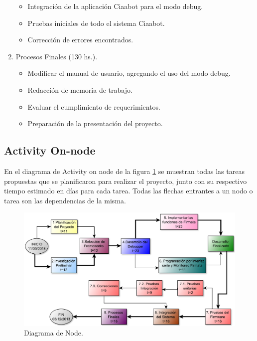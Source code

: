 \begin{enumerate}
	\begin{itemize}
		\item Integración de la aplicación Ciaabot para el modo debug.
		\item Pruebas iniciales de todo el sistema Ciaabot.
		\item Corrección de errores encontrados.
	\end{itemize}

	\item Procesos Finales (130 hs.).
	
	\begin{itemize}
		\item Modificar el manual de usuario, agregando el uso del modo debug.
		\item Redacción de memoria de trabajo.
		\item Evaluar el cumplimiento de requerimientos.
		\item Preparación de la presentación del proyecto.
	\end{itemize}

\end{enumerate}

\subsection{Activity On-node} 

En el diagrama de Activity on node de la figura  \ref{fig:diagramaNode} se muestran todas las tareas propuestas que se planificaron para realizar el proyecto, junto con su respectivo tiempo estimado en días para cada tarea.
Todas las flechas entrantes a un nodo o tarea son las dependencias de la misma.
 

\begin{figure}[h]
	\centering
	\includegraphics[width=14cm]{./Figures/aon.pdf}
	\caption{Diagrama de Node.}
	\label{fig:diagramaNode}
\end{figure}

